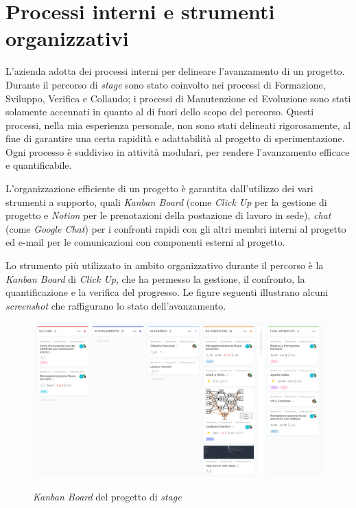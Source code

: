 \section{Processi interni e strumenti organizzativi}

%


L'azienda adotta dei processi interni per delineare l'avanzamento di un progetto.
Durante il percorso di \textit{stage} sono stato coinvolto nei processi di Formazione, Sviluppo, Verifica e Collaudo; i processi di Manutenzione ed Evoluzione sono stati solamente accennati in quanto al di fuori dello scopo del percorso.
Questi processi, nella mia esperienza personale, non sono stati delineati rigorosamente, al fine di garantire una certa rapidità e adattabilità al progetto di sperimentazione.
Ogni processo è suddiviso in attività modulari, per rendere l'avanzamento efficace e quantificabile.

L'organizzazione efficiente di un progetto è garantita dall'utilizzo dei vari strumenti a supporto, quali \textit{Kanban Board} (come \textit{Click Up} per la gestione di progetto e \textit{Notion} per le prenotazioni della postazione di lavoro in sede), \textit{chat} (come \textit{Google Chat}) per i confronti rapidi con gli altri membri interni al progetto ed e-mail per le comunicazioni con componenti esterni al progetto.

Lo strumento più utilizzato in ambito organizzativo durante il percorso è la \textit{Kanban Board} di \textit{Click Up}, che ha permesso la gestione, il confronto, la quantificazione e la verifica del progresso.
Le figure seguenti illustrano alcuni \textit{screenshot} che raffigurano lo stato dell'avanzamento.

\bigskip
\begin{figure}[h]
  \includegraphics[width=\textwidth]{images/clickup_board_v2.png}\\
  \caption{\textit{Kanban Board} del progetto di \textit{stage}}
\end{figure}

